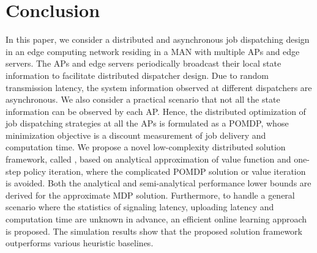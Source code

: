 \section{Conclusion}
\label{sec:conclusion}
In this paper, we consider a distributed and asynchronous job dispatching design in an edge computing network residing in a MAN with multiple APs and edge servers.
The APs and edge servers periodically broadcast their local state information to facilitate distributed dispatcher design.
Due to random transmission latency, the system information observed at different dispatchers are asynchronous.
We also consider a practical scenario that not all the state information can be observed by each AP.
Hence, the distributed optimization of job dispatching strategies at all the APs is formulated as a POMDP, whose minimization objective is a discount measurement of job delivery and computation time.
We propose a novel low-complexity distributed solution framework, called \algname, based on analytical approximation of value function and one-step policy iteration, where the complicated POMDP solution or value iteration is avoided. Both the analytical and semi-analytical performance lower bounds are derived for the approximate MDP solution.
{Furthermore}, to handle a general scenario where the statistics of signaling latency, uploading latency and computation time are unknown in advance, an efficient online learning approach is proposed.
The simulation results show that the proposed solution framework outperforms various heuristic baselines.
